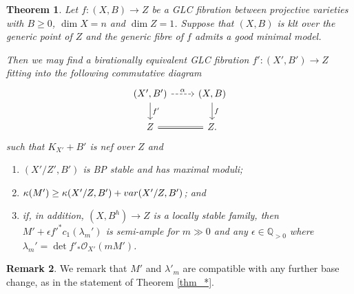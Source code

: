 \documentclass[12pt]{amsart}
\theoremstyle{plain}
\newtheorem{theorem}{Theorem}[section]
\theoremstyle{definition}
\newtheorem{remark}[theorem]{Remark}
\def\dim{\operatorname{dim}}
\def\det{\operatorname{det}}
\def \QP {\mathbb Q_{>0}}
\begin{document}
\begin{theorem}
\label{thm_curve_base}
Let $f\colon (X, B) \rightarrow Z$ be a GLC fibration between projective varieties 
with $B \geq 0$, $\dim X= n$ and $\dim Z = 1$.
Suppose that 
$(X, B)$ is klt over the generic point of $Z$ and the generic fibre of $f$ admits a good minimal model.


Then we may find a birationally equivalent GLC fibration 
$f'\colon (X', B') \rightarrow Z$
fitting into the following commutative diagram
\[
\begin{tikzcd}
  (X', B') \arrow[r, "\alpha", dashrightarrow] \arrow[d, "f'"] & (X, B) \arrow[d, "f"] \\
  Z \arrow[r, equal] &  Z.
 \end{tikzcd}
\]
such that $K_{X'}+B'$ is nef over $Z$ and 

\begin{enumerate}
\item $(X'/Z', B')$ is BP stable and has maximal moduli;
\item $\kappa(M') \geq \kappa(X'/Z, B')+{\rm var}(X'/Z, B')$; and 

\item if, in addition, $(X, B^h) \to Z$ is a locally stable family, then  $M'+\epsilon f'^*c_1(\lambda_m')$ is semi-ample for $m\gg 0$ and any $\epsilon \in \QP$
where $\lambda_m' = \det f'_*\mathcal O_{X'}(mM')$.



\end{enumerate}
\end{theorem}

\begin{remark}
We remark that $M'$ and $\lambda'_m$ are compatible with any further base change, as in 
the statement of Theorem \ref{thm_*}.
\end{remark}
\end{document}
